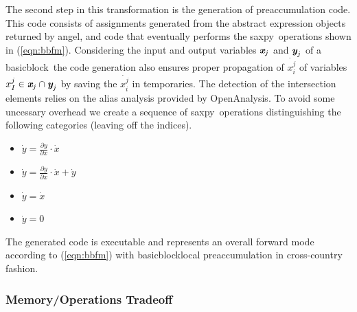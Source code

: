 \documentclass[11pt]{article}
\newcommand{\angel}{angel}
\newcommand{\basicblock}{basicblock}
\newcommand{\OpenAnalysis}{OpenAnalysis}
\newcommand{\saxpy}{saxpy}
\newcommand{\bmx}{\mbox{\bf\em x}}
\newcommand{\bmy}{\mbox{\bf\em y}}
\newcommand{\refeqn}[1]{{(\ref{#1})}}
\begin{document}
The second step in this transformation is the generation of preaccumulation code. 
This code consists of assignments generated from  the abstract expression objects returned by \angel, 
and code that eventually performs the \saxpy\ operations shown in \refeqn{eqn:bbfm}. 
Considering the input and output variables $\bmx_j$ and $\bmy_j$ of a \basicblock\ the code generation 
also ensures proper propagation of $\dot{x_i^j}$ of variables $ x_I^j \in  \bmx_j \cap \bmy_j$ 
by saving the $\dot{x_i^j}$ in temporaries.
The detection of the intersection elements relies on the alias analysis provided by 
\OpenAnalysis.
To avoid some uncessary overhead 
we create a sequence of \saxpy\ operations distinguishing the following categories (leaving off 
the indices). 
\begin{itemize}
\item $\dot{y} = \frac{\partial y }{\partial x }\cdot \dot{x}$
\item $\dot{y} = \frac{\partial y }{\partial x }\cdot \dot{x} + \dot{y}$
\item $\dot{y} = \dot{x}$
\item $\dot{y} = 0$	
\end{itemize}

The generated code is executable and represents an overall forward mode 
according to \refeqn{eqn:bbfm} with \basicblock\-local preaccumulation in 
cross-country fashion. 

\subsubsection{Memory/Operations Tradeoff}\label{sssec:MMTradeOff}
\end{document}
